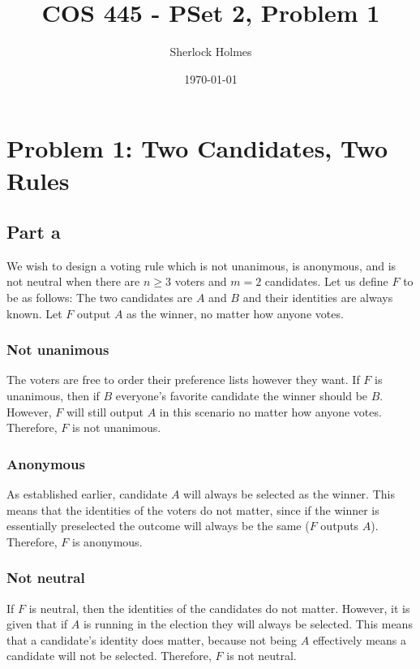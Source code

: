 \documentclass[12pt]{article}%
\begin{document}
\title{COS 445 - PSet 2, Problem 1} %
\author{Sherlock Holmes} %
\date{\today}
\maketitle
\section*{Problem 1: Two Candidates, Two Rules}
\subsection*{Part a}
We wish to design a voting rule which is not unanimous, is anonymous, and is not neutral when there are $n \ge 3$ voters and $m = 2$ candidates. Let us define $F$ to be as follows: The two candidates are $A$ and $B$ and their identities are always known. Let $F$ output $A$ as the winner, no matter how anyone votes.

\subsubsection*{Not unanimous}
The voters are free to order their preference lists however they want. If $F$ is unanimous, then if $B$ everyone's favorite candidate the winner should be $B$. However, $F$ will still output $A$ in this scenario no matter how anyone votes. Therefore, $F$ is not unanimous.

\subsubsection*{Anonymous}
As established earlier, candidate $A$ will always be selected as the winner. This means that the identities of the voters do not matter, since if the winner is essentially preselected the outcome will always be the same ($F$ outputs $A$). Therefore, $F$ is anonymous.

\subsubsection*{Not neutral}
If $F$ is neutral, then the identities of the candidates do not matter. However, it is given that if $A$ is running in the election they will always be selected. This means that a candidate's identity does matter, because not being $A$ effectively means a candidate will not be selected. Therefore, $F$ is not neutral.
\end{document}
